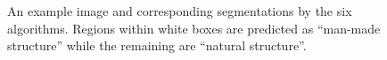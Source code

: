 \begin{figure}[t!]
    \caption{An example image and corresponding segmentations by the six algorithms. Regions within white boxes are predicted as ``man-made structure'' while 
	the remaining are ``natural structure''. }   
    \label{fig:img_seg_example}
\end{figure}


